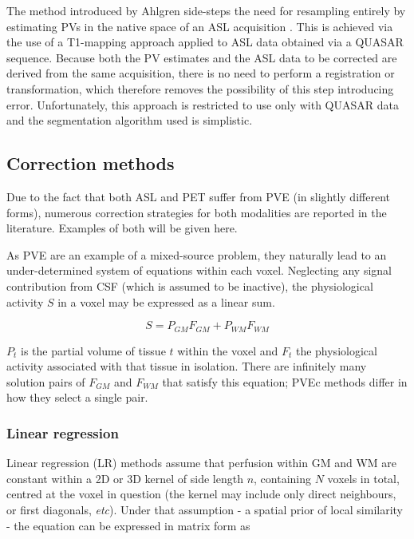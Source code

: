 The method introduced by Ahlgren side-steps the need for resampling entirely by estimating PVs in the native space of an ASL acquisition \cite{Ahlgren2014}. This is achieved via the use of a T1-mapping approach applied to ASL data obtained via a QUASAR sequence. Because both the PV estimates and the ASL data to be corrected are derived from the same acquisition, there is no need to perform a registration or transformation, which therefore removes the possibility of this step introducing error. Unfortunately, this approach is restricted to use only with QUASAR data and the segmentation algorithm used is simplistic. 

\subsection{Correction methods}

Due to the fact that both ASL and PET suffer from PVE (in slightly different forms), numerous correction strategies for both modalities are reported in the literature. Examples of both will be given here. 

As PVE are an example of a mixed-source problem, they naturally lead to an under-determined system of equations within each voxel. Neglecting any signal contribution from CSF (which is assumed to be inactive), the physiological activity $S$ in a voxel may be expressed as a linear sum. 

\begin{equation}
S = P_{GM} F_{GM}+ P_{WM} F_{WM}
\end{equation} 

$P_t$ is the partial volume of tissue $t$ within the voxel and $F_{t}$ the physiological activity associated with that tissue in isolation. There are infinitely many solution pairs of $F_{GM}$ and $F_{WM}$ that satisfy this equation; PVEc methods differ in how they select a single pair.

\subsubsection{Linear regression}

Linear regression (LR) methods assume that perfusion within GM and WM are constant within a 2D or 3D kernel of side length $n$, containing $N$ voxels in total, centred at the voxel in question (the kernel may include only direct neighbours, or first diagonals, \textit{etc}). Under that assumption - a spatial prior of local similarity - the equation can be expressed in matrix form as

